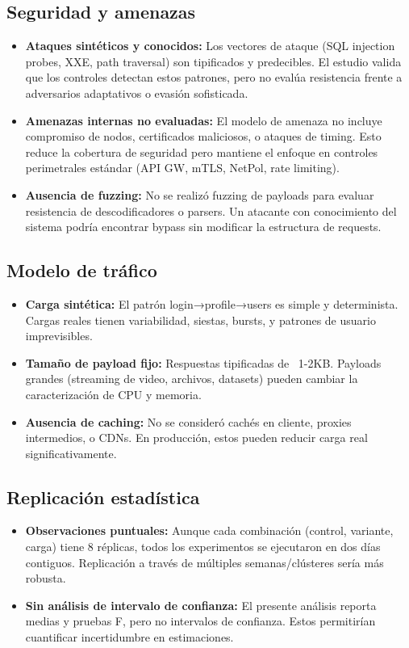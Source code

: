 \subsection{Seguridad y amenazas}
\begin{itemize}
	\item \textbf{Ataques sintéticos y conocidos:} Los vectores de ataque (SQL injection probes, XXE, path traversal) son tipificados y predecibles. El estudio valida que los controles detectan estos patrones, pero no evalúa resistencia frente a adversarios adaptativos o evasión sofisticada.
	\item \textbf{Amenazas internas no evaluadas:} El modelo de amenaza no incluye compromiso de nodos, certificados maliciosos, o ataques de timing. Esto reduce la cobertura de seguridad pero mantiene el enfoque en controles perimetrales estándar (API GW, mTLS, NetPol, rate limiting).
	\item \textbf{Ausencia de fuzzing:} No se realizó fuzzing de payloads para evaluar resistencia de descodificadores o parsers. Un atacante con conocimiento del sistema podría encontrar bypass sin modificar la estructura de requests.
\end{itemize}

\subsection{Modelo de tráfico}
\begin{itemize}
	\item \textbf{Carga sintética:} El patrón login→profile→users es simple y determinista. Cargas reales tienen variabilidad, siestas, bursts, y patrones de usuario imprevisibles.
	\item \textbf{Tamaño de payload fijo:} Respuestas tipificadas de ~1-2KB. Payloads grandes (streaming de video, archivos, datasets) pueden cambiar la caracterización de CPU y memoria.
	\item \textbf{Ausencia de caching:} No se consideró cachés en cliente, proxies intermedios, o CDNs. En producción, estos pueden reducir carga real significativamente.
\end{itemize}

\subsection{Replicación estadística}
\begin{itemize}
	\item \textbf{Observaciones puntuales:} Aunque cada combinación (control, variante, carga) tiene 8 réplicas, todos los experimentos se ejecutaron en dos días contiguos. Replicación a través de múltiples semanas/clústeres sería más robusta.
	\item \textbf{Sin análisis de intervalo de confianza:} El presente análisis reporta medias y pruebas F, pero no intervalos de confianza. Estos permitirían cuantificar incertidumbre en estimaciones.
\end{itemize}


